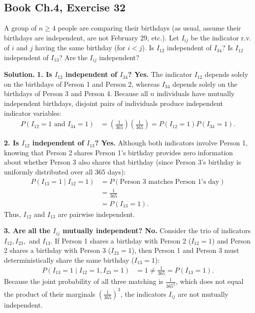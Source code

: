 \documentclass[11pt,a4paper]{article}
\begin{document}
\vspace{10pt}
\subsection{Book Ch.4, Exercise 32}
\begin{tcolorbox}[title={Book Ch.4, Exercise 32}]
A group of $n \ge 4$ people are comparing their birthdays (as usual, assume their birthdays are independent, are not February 29, etc.). Let $I_{ij}$ be the indicator r.v. of $i$ and $j$ having the same birthday (for $i < j$). Is $I_{12}$ independent of $I_{34}$? Is $I_{12}$ independent of $I_{13}$? Are the $I_{ij}$ independent?
\end{tcolorbox}

\noindent \textbf{Solution.} \textbf{1. Is $I_{12}$ independent of $I_{34}$? Yes.}
The indicator $I_{12}$ depends solely on the birthdays of Person 1 and Person 2, whereas $I_{34}$ depends solely on the birthdays of Person 3 and Person 4. Because all $n$ individuals have mutually independent birthdays, disjoint pairs of individuals produce independent indicator variables:
\begin{align*}
P(I_{12} = 1 \text{ and } I_{34} = 1) &= \left(\frac{1}{365}\right) \left(\frac{1}{365}\right) = P(I_{12} = 1) P(I_{34} = 1).
\end{align*}

\vspace{4pt}
\noindent \textbf{2. Is $I_{12}$ independent of $I_{13}$? Yes.}
Although both indicators involve Person 1, knowing that Person 2 shares Person 1's birthday provides zero information about whether Person 3 also shares that birthday (since Person 3's birthday is uniformly distributed over all 365 days):
\begin{align*}
P(I_{13} = 1 \mid I_{12} = 1) &= P(\text{Person 3 matches Person 1's day}) \\
&= \frac{1}{365} \\
&= P(I_{13} = 1).
\end{align*}
Thus, $I_{12}$ and $I_{13}$ are pairwise independent.

\vspace{4pt}
\noindent \textbf{3. Are all the $I_{ij}$ mutually independent? No.}
Consider the trio of indicators $I_{12}, I_{23},$ and $I_{13}$. If Person 1 shares a birthday with Person 2 ($I_{12} = 1$) and Person 2 shares a birthday with Person 3 ($I_{23} = 1$), then Person 1 and Person 3 must deterministically share the same birthday ($I_{13} = 1$):
\begin{align*}
P(I_{13} = 1 \mid I_{12} = 1, I_{23} = 1) &= 1 \neq \frac{1}{365} = P(I_{13} = 1).
\end{align*}
Because the joint probability of all three matching is $\frac{1}{365^2}$, which does not equal the product of their marginals $\left(\frac{1}{365}\right)^3$, the indicators $I_{ij}$ are not mutually independent.
\end{document}
